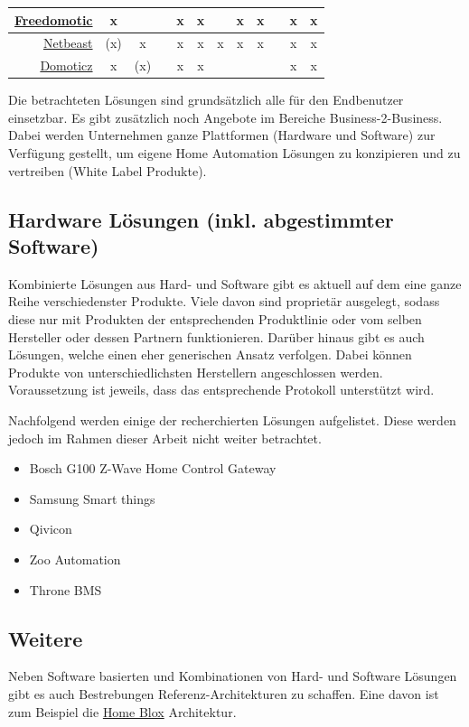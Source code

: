 \begin{table}[H]
\begin{tabular}{r | c  | c | c | c | c | c | c | c | c | c | c}
\midrule
\hyperlink{http://www.freedomotic.com/}{Freedomotic}
	& x
	& 
	& 
	& x\footnotemark[1]
	& x
	& 
	& x
	& x
	& 
	& x
	& x\\
	
\midrule
\hyperlink{https://netbeast.co/}{Netbeast}
	& (x)
	& x
	& 
	& x
	& x
	& x
	& x
	& x
	& 
	& x
	& x \\
	
\midrule
\hyperlink{http://www.domoticz.com/}{Domoticz}
	& x
	& (x)
	& 
	& x
	& x
	& 
	& \footnotemark[2]
	& \footnotemark[2]
	& 
	& x
	& x\\
\bottomrule
\end{tabular}
\end{table}


\newpage
Die betrachteten Lösungen sind grundsätzlich alle für den Endbenutzer einsetzbar. Es gibt zusätzlich noch Angebote im Bereiche Business-2-Business. Dabei werden Unternehmen ganze Plattformen (Hardware und Software) zur Verfügung gestellt, um eigene Home Automation Lösungen zu konzipieren und zu vertreiben (White Label Produkte).

\subsection{Hardware Lösungen (inkl. abgestimmter Software)}
Kombinierte Lösungen aus Hard- und Software gibt es aktuell auf dem eine ganze Reihe verschiedenster Produkte. Viele davon sind proprietär ausgelegt, sodass diese nur mit Produkten der entsprechenden Produktlinie oder vom selben Hersteller oder dessen Partnern funktionieren. Darüber hinaus gibt es auch Lösungen, welche einen eher generischen Ansatz verfolgen. Dabei können Produkte von unterschiedlichsten Herstellern angeschlossen werden. Voraussetzung ist jeweils, dass das entsprechende Protokoll unterstützt wird.

Nachfolgend werden einige der recherchierten Lösungen aufgelistet. Diese werden jedoch im Rahmen dieser Arbeit nicht weiter betrachtet.

\begin{itemize}
\item Bosch G100 Z-Wave Home Control Gateway
\item Samsung Smart things
\item Qivicon
\item Zoo Automation
\item Throne BMS
\end{itemize}

\subsection{Weitere}
Neben Software basierten und Kombinationen von Hard- und Software Lösungen gibt es auch Bestrebungen Referenz-Architekturen zu schaffen. Eine davon ist zum Beispiel die  \hyperlink{http://www.ubicomp.org/ubicomp2013/adjunct/adjunct/p801.pdf}{Home Blox} Architektur.


